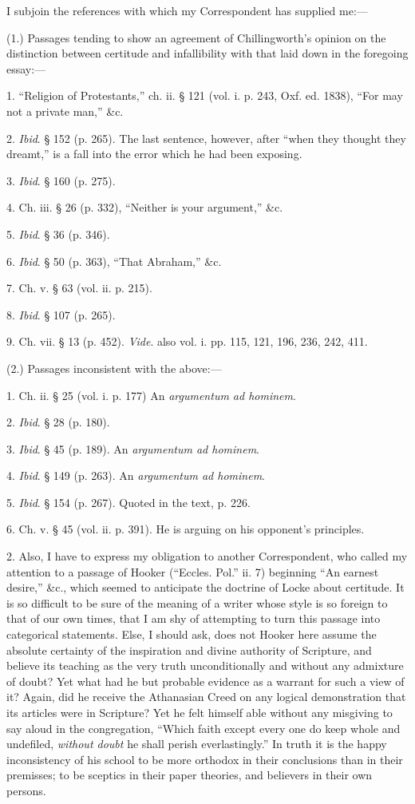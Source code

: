 I subjoin the references with which my Correspondent has supplied
me:—


(1.) Passages tending to show an agreement of Chillingworth's
opinion on the distinction between certitude and infallibility with
that laid down in the foregoing essay:—


1. ``Religion of Protestants,'' ch. ii. § 121 (vol. i. p.
243, Oxf. ed. 1838), ``For may not a private man,'' \&c.


2. \emph{Ibid}. § 152 (p. 265). The last sentence, however, after
``when they thought they dreamt,'' is a fall into the error
which he had been exposing.


3. \emph{Ibid}. § 160 (p. 275).


4. Ch. iii. § 26 (p. 332), ``Neither is your argument,''
\&c.


5. \emph{Ibid}. § 36 (p. 346).


6. \emph{Ibid}. § 50 (p. 363), ``That Abraham,'' \&c.


7. Ch. v. § 63 (vol. ii. p. 215).


8. \emph{Ibid}. § 107 (p. 265).


9. Ch. vii. § 13 (p. 452).
\emph{Vide}. also vol. i. pp. 115, 121, 196, 236, 242, 411.


(2.) Passages inconsistent with the above:—


1. Ch. ii. § 25 (vol. i. p. 177) An \emph{argumentum ad hominem}.


2. \emph{Ibid}. § 28 (p. 180).


3. \emph{Ibid}. § 45 (p. 189). An \emph{argumentum ad hominem}.


4. \emph{Ibid}. § 149 (p. 263). An \emph{argumentum ad hominem}.


5. \emph{Ibid}. § 154 (p. 267). Quoted in the text, p. 226.


6. Ch. v. § 45 (vol. ii. p. 391). He is arguing on his opponent's
principles.


2. Also, I have to express my obligation to another Correspondent,
who called my attention to a passage of Hooker (``Eccles. Pol.''
ii. 7) beginning ``An earnest desire,'' \&c., which seemed
to anticipate the doctrine of Locke about certitude. It is so
difficult to be sure of the meaning of a writer whose style is so
foreign to that of our own times, that I am shy of attempting to turn
this passage into categorical statements. Else, I should ask, does not
Hooker here assume the absolute certainty of the inspiration and
divine authority of Scripture, and believe its teaching as the very
truth unconditionally and without any admixture of doubt? Yet what had
he but probable evidence as a warrant for such a view of it? Again,
did he receive the Athanasian Creed on any logical demonstration that
its articles were in Scripture? Yet he felt himself able without any
misgiving to say aloud in the congregation, ``Which faith except
every one do keep whole and undefiled, \emph{without doubt} he shall
perish everlastingly.'' In truth it is the happy inconsistency of
his school to be more orthodox in their conclusions than in their
premisses; to be sceptics in their paper theories, and believers in
their own persons.


